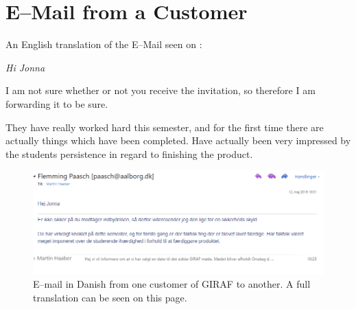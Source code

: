 \chapter{E--Mail from a Customer}\label{app:mail}

An English translation of the E--Mail seen on :  

\begin{displayquote}  
\itshape%
Hi Jonna

\medskip \noindent
I am not sure whether or not you receive the invitation, so therefore I am forwarding it to be sure. 

\medskip \noindent
They have really worked hard this semester, and for the first time there are actually things which have been completed. Have actually been very impressed by the students persistence in regard to finishing the product.     
\end{displayquote}

\begin{figure}[H]
    \includegraphics[width=\textwidth]{figures/img/email.png}
    \caption{E--mail in Danish from one customer of GIRAF to another. A full translation can be seen on this page.}\label{fig:email}
\end{figure}

